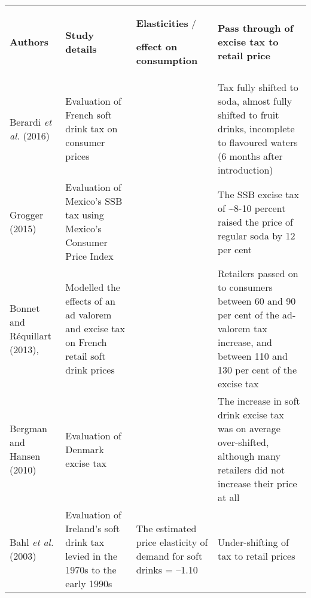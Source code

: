 \bgroup
\def\arraystretch{1.5}
\begin{tabularx}{\textwidth}{Xp{5cm}p{5cm}p{10cm}}
\toprule
\textbf{Authors} & \textbf{Study details} & \multicolumn{1}{p{5cm}}{\textbf{Elasticities} / 

\textbf{effect on consumption}} & \textbf{Pass through of excise tax to retail price} \\
\cmidrule(lr){1-4}
Berardi \emph{et al.} (2016) & Evaluation of French soft drink tax on consumer prices & & Tax fully shifted to soda, almost fully shifted to fruit drinks, incomplete to flavoured waters (6 months after introduction) \\
Grogger (2015) & Evaluation of Mexico's SSB tax using Mexico's Consumer Price Index & & The SSB excise tax of \textasciitilde{}8-10 percent raised the price of regular soda by 12 per cent \\
Bonnet and R\'equillart (2013), & Modelled the effects of an ad valorem and excise tax on French retail soft drink prices & & Retailers passed on to consumers between 60 and 90 per cent of the ad-valorem tax increase, and between 110 and 130 per cent of the excise tax \\
Bergman and Hansen (2010) & Evaluation of Denmark excise tax & & The increase in soft drink excise tax was on average over-shifted, although many retailers did not increase their price at all \\
Bahl \emph{et al.} (2003) & Evaluation of Ireland's soft drink tax levied in the 1970s to the early 1990s & The estimated price elasticity of demand for soft drinks = --1.10 & Under-shifting of tax to retail prices \\
\bottomrule
\end{tabularx}
\egroup